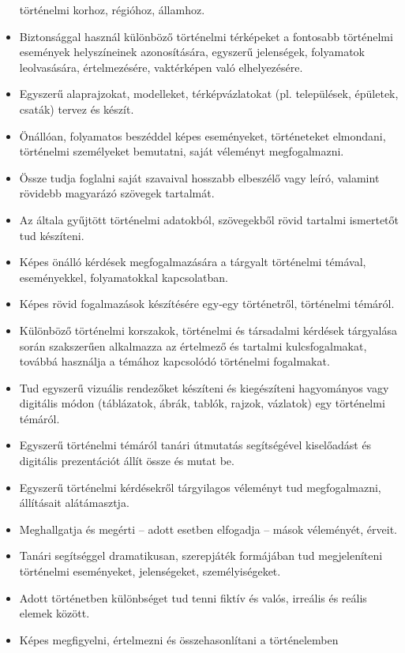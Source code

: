 \begin{itemize}
  történelmi korhoz, régióhoz, államhoz.
\item
  Biztonsággal használ különböző történelmi térképeket a fontosabb
  történelmi események helyszíneinek azonosítására, egyszerű jelenségek,
  folyamatok leolvasására, értelmezésére, vaktérképen való
  elhelyezésére.
\item
  Egyszerű alaprajzokat, modelleket, térképvázlatokat (pl. települések,
  épületek, csaták) tervez és készít.
\item
  Önállóan, folyamatos beszéddel képes eseményeket, történeteket
  elmondani, történelmi személyeket bemutatni, saját véleményt
  megfogalmazni.
\item
  Össze tudja foglalni saját szavaival hosszabb elbeszélő vagy leíró,
  valamint rövidebb magyarázó szövegek tartalmát.
\item
  Az általa gyűjtött történelmi adatokból, szövegekből rövid tartalmi
  ismertetőt tud készíteni.
\item
  Képes önálló kérdések megfogalmazására a tárgyalt történelmi témával,
  eseményekkel, folyamatokkal kapcsolatban.
\item
  Képes rövid fogalmazások készítésére egy-egy történetről, történelmi
  témáról.
\item
  Különböző történelmi korszakok, történelmi és társadalmi kérdések
  tárgyalása során szakszerűen alkalmazza az értelmező és tartalmi
  kulcsfogalmakat, továbbá használja a témához kapcsolódó történelmi
  fogalmakat.
\item
  Tud egyszerű vizuális rendezőket készíteni és kiegészíteni hagyományos
  vagy digitális módon (táblázatok, ábrák, tablók, rajzok, vázlatok) egy
  történelmi témáról.
\item
  Egyszerű történelmi témáról tanári útmutatás segítségével kiselőadást
  és digitális prezentációt állít össze és mutat be.
\item
  Egyszerű történelmi kérdésekről tárgyilagos véleményt tud
  megfogalmazni, állításait alátámasztja.
\item
  Meghallgatja és megérti -- adott esetben elfogadja -- mások
  véleményét, érveit.
\item
  Tanári segítséggel dramatikusan, szerepjáték formájában tud
  megjeleníteni történelmi eseményeket, jelenségeket, személyiségeket.
\item
  Adott történetben különbséget tud tenni fiktív és valós, irreális és
  reális elemek között.
\item
  Képes megfigyelni, értelmezni és összehasonlítani a történelemben

\end{itemize}
